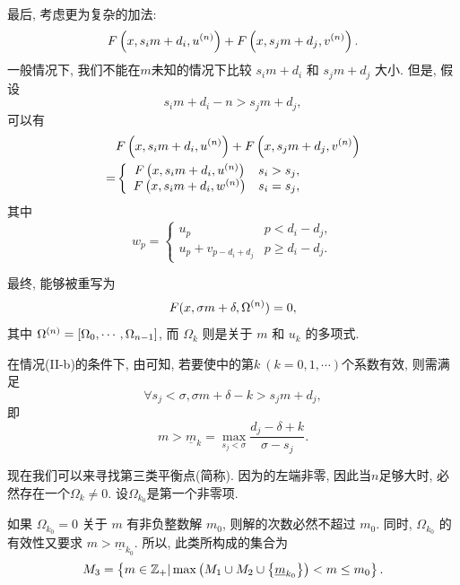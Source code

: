 最后, 考虑更为复杂的加法: 
\begin{equation}
F\left(x,s_i m+d_i,u^{(n)}\right)+F\left(x,s_j m+d_j,v^{(n)}\right).
\end{equation}
一般情况下, 我们不能在$m$未知的情况下比较 $s_i m + d_i$ 和 $s_j m + d_j$ 大小. 但是, 假设
\begin{equation}
s_i m+d_i-n > s_j m+d_j, \label{cond_add}
\end{equation}
可以有 
\begin{equation}
\begin{aligned}
&F\left(x,s_i m+d_i,u^{(n)}\right)+F\left(x,s_j m+d_j,v^{(n)}\right) \\
=&\left\{
\begin{array}{cl}
    F\left(x,s_i m+d_i,u^{(n)}\right) & s_i>s_j,            \\
    F\left(x,s_i m+d_i,w^{(n)}\right) & s_i=s_j,
\end{array}
\right.
\end{aligned} \label{NEM-add}
\end{equation}
其中
\begin{equation}
w_p=\left\{
\begin{array}{cl}
u_p               & p<d_i-d_j ,   \\
u_p+v_{p-d_i+d_j} & p\ge d_i-d_j.
\end{array}
\right.
\end{equation}

最终,  能够被重写为
\begin{equation}
F(x,\sigma m + \delta,\Omega^{(n)})=0, 
\label{eq-np}
\end{equation}
其中 $\Omega^{(n)}=\left[\Omega_0,\cdots,\Omega_{n-1}\right]$, 而 $\Omega_k$ 则是关于 $m$ 和 $u_k$ 的多项式.

在情况(II-b)的条件下, 由可知, 若要使中的第$k~(k=0,1,\cdots)$个系数有效, 则需满足 
\begin{equation}
\forall s_j<\sigma, \sigma m + \delta - k > s_j m + d_j,
\end{equation}
即
\begin{equation}
m > \underline{m}_k=\underset{s_j<\sigma}{\max}{\frac{d_j-\delta+k}{\sigma-s_j}}.
\end{equation}

现在我们可以来寻找第三类平衡点(简称\BPthree{}). 因为的左端非零, 因此当$n$足够大时, 必然存在一个$\Omega_k\neq 0$. 设$\Omega_{k_0}$是第一个非零项. 

如果 $\Omega_{k_0}=0$ 关于 $m$ 有非负整数解 $m_0$, 则解的次数必然不超过 $m_0$. 同时, $\Omega_{k_0}$ 的有效性又要求 $m>\underline{m}_{k_0}$. 所以, 此类\BPthree{}所构成的集合为 
\begin{equation}
M_3=\left\{m\in \mathbb Z_+|\max\left(M_1\cup M_2 \cup \left\{\underline{m}_{k_0}\right\}\right)<m\le m_0\right\}. \label{BP31}
\end{equation}

